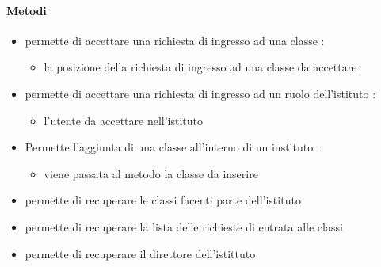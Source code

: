\paragraph{Metodi}
\begin{itemize}
\item {}
\newline
permette di accettare una richiesta di ingresso ad una classe
\newline
{} :
\begin{itemize}
\item {}
\newline
la posizione della richiesta di ingresso ad una classe da accettare
\end{itemize}
\item {}
\newline
permette di accettare una richiesta di ingresso ad un ruolo dell'istituto
\newline
{} :
\begin{itemize}
\item {}
\newline
l'utente da accettare nell'istituto
\end{itemize}
\item {}
\newline
Permette l'aggiunta di una classe all'interno di un instituto
\newline
{} :
\begin{itemize}
\item {}
\newline
viene passata al metodo la classe da inserire
\end{itemize}
\item {}
\newline
permette di recuperare le classi facenti parte dell'istituto
\newline
\item {}
\newline
permette di recuperare la lista delle richieste di entrata alle classi
\newline
\item {}
\newline
permette di recuperare il direttore dell'istittuto

\end{itemize}
